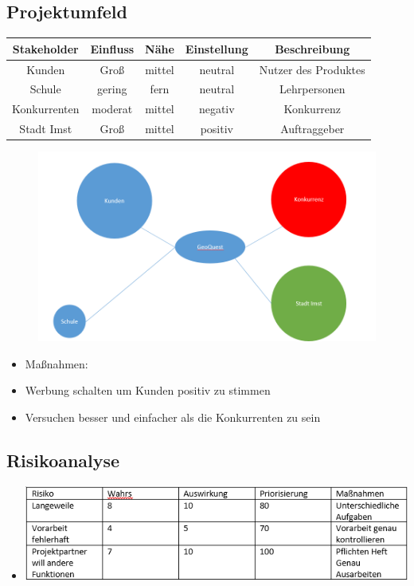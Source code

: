 \subsection{Projektumfeld}
\begin{tabular}{|c|c|c|c|c|}
	\hline 
	Stakeholder &Einfluss  &Nähe  &Einstellung  &Beschreibung  \\ 
	\hline 
	Kunden &Groß  &mittel  &neutral  &Nutzer des Produktes  \\ 
	\hline 
	Schule &gering  &fern  &neutral  &Lehrpersonen  \\ 
	\hline 
	Konkurrenten &moderat  &mittel  &negativ  &Konkurrenz  \\ 
	\hline 
	Stadt Imst &Groß  &mittel  &positiv  &Auftraggeber  \\ 
	\hline
\end{tabular} 
\begin{figure}
	\centering
	\includegraphics[width=1\linewidth]{GrafischeDarstellung}
	\caption{}
	\label{fig:grafischedarstellung}
\end{figure}
\begin{itemize}
	\item Maßnahmen:\\
	\item Werbung schalten um Kunden positiv zu stimmen
	\item Versuchen besser und einfacher als die Konkurrenten zu sein
	
\end{itemize}
\subsection{Risikoanalyse}
\begin{itemize}
	
		\item \includegraphics[width=1\linewidth]{Risikoanalyse}
\end{itemize}
